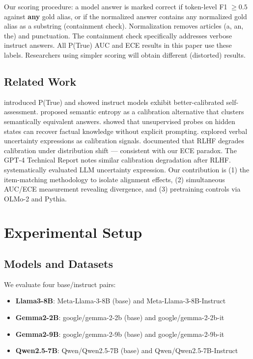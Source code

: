 \documentclass[11pt]{article}
\begin{document}
Our scoring procedure: a model answer is marked correct if token-level F1 $\geq 0.5$ against \textbf{any} gold alias, or if the normalized answer contains any normalized gold alias as a substring (containment check). Normalization removes articles (a, an, the) and punctuation. The containment check specifically addresses verbose instruct answers. All P(True) AUC and ECE results in this paper use these labels. Researchers using simpler scoring will obtain different (distorted) results.

\subsection{Related Work}

\citet{kadavath2022} introduced P(True) and showed instruct models exhibit better-calibrated self-assessment. \citet{kuhn2023} proposed semantic entropy as a calibration alternative that clusters semantically equivalent answers. \citet{burns2023} showed that unsupervised probes on hidden states can recover factual knowledge without explicit prompting. \citet{lin2022} explored verbal uncertainty expressions as calibration signals. \citet{tian2023} documented that RLHF degrades calibration under distribution shift --- consistent with our ECE paradox. The GPT-4 Technical Report \citep{openai2023} notes similar calibration degradation after RLHF. \citet{xiong2024} systematically evaluated LLM uncertainty expression. Our contribution is (1) the item-matching methodology to isolate alignment effects, (2) simultaneous AUC/ECE measurement revealing divergence, and (3) pretraining controls via OLMo-2 and Pythia.

\section{Experimental Setup}
\label{sec:setup}

\subsection{Models and Datasets}

We evaluate four base/instruct pairs:

\begin{itemize}
  \item \textbf{Llama3-8B}: Meta-Llama-3-8B (base) and Meta-Llama-3-8B-Instruct
  \item \textbf{Gemma2-2B}: google/gemma-2-2b (base) and google/gemma-2-2b-it
  \item \textbf{Gemma2-9B}: google/gemma-2-9b (base) and google/gemma-2-9b-it
  \item \textbf{Qwen2.5-7B}: Qwen/Qwen2.5-7B (base) and Qwen/Qwen2.5-7B-Instruct
\end{itemize}
\end{document}
